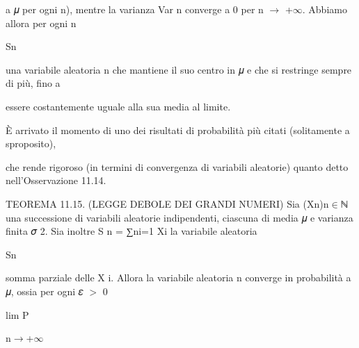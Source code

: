 \documentclass[a4paper,portrait,12pt]{article}
\begin{document}
\begin{flushleft}
a 𝜇 per ogni n), mentre la varianza Var n converge a 0 per n $\rightarrow$ +$\infty$. Abbiamo allora per ogni n
\end{flushleft}


\begin{flushleft}
Sn
\end{flushleft}


\begin{flushleft}
una variabile aleatoria n che mantiene il suo centro in 𝜇 e che si restringe sempre di più, fino a
\end{flushleft}


\begin{flushleft}
essere costantemente uguale alla sua media al limite.
\end{flushleft}


\begin{flushleft}
\`{E} arrivato il momento di uno dei risultati di probabilit\`{a} più citati (solitamente a sproposito),
\end{flushleft}


\begin{flushleft}
che rende rigoroso (in termini di convergenza di variabili aleatorie) quanto detto nell'Osservazione 11.14.
\end{flushleft}


\begin{flushleft}
TEOREMA 11.15. (LEGGE DEBOLE DEI GRANDI NUMERI) Sia (Xn)n$\in$ℕ una successione di variabili aleatorie indipendenti, ciascuna di media 𝜇 e varianza finita 𝜎 2. Sia inoltre S n = ∑ni=1 Xi la variabile aleatoria
\end{flushleft}


\begin{flushleft}
Sn
\end{flushleft}


\begin{flushleft}
somma parziale delle X i. Allora la variabile aleatoria n converge in probabilit\`{a} a 𝜇, ossia per ogni 𝜀 $>$ 0
\end{flushleft}


\begin{flushleft}
lim P
\end{flushleft}





\begin{flushleft}
n$\rightarrow$+$\infty$
\end{flushleft}
\end{document}
